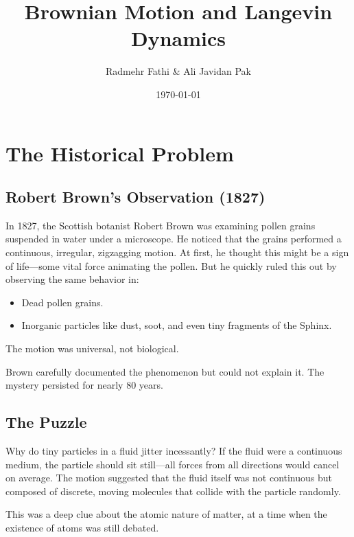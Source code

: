 \documentclass[11pt,a4paper]{article}
\title{Brownian Motion and Langevin Dynamics}
\author{Radmehr Fathi \& Ali Javidan Pak}
\date{\today}
\begin{document}
	
	\maketitle
	\tableofcontents
	\newpage
	
	\section{The Historical Problem}
	
	\subsection{Robert Brown's Observation (1827)}
	
	In 1827, the Scottish botanist Robert Brown was examining pollen grains suspended in water under a microscope. He noticed that the grains performed a continuous, irregular, zigzagging motion. At first, he thought this might be a sign of life---some vital force animating the pollen. But he quickly ruled this out by observing the same behavior in:
	\begin{itemize}
		\item Dead pollen grains.
		\item Inorganic particles like dust, soot, and even tiny fragments of the Sphinx.
	\end{itemize}
	The motion was universal, not biological.
	
	Brown carefully documented the phenomenon but could not explain it. The mystery persisted for nearly 80 years.
	
	\subsection{The Puzzle}
	
	Why do tiny particles in a fluid jitter incessantly? If the fluid were a continuous medium, the particle should sit still---all forces from all directions would cancel on average. The motion suggested that the fluid itself was not continuous but composed of discrete, moving molecules that collide with the particle randomly.
	
	This was a deep clue about the atomic nature of matter, at a time when the existence of atoms was still debated.
	
\end{document}
